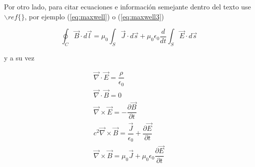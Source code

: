 Por otro lado, para citar ecuaciones e información semejante dentro del texto use $\backslash ref\{\}$, por ejemplo (\ref{eq:maxwell}) o (\ref{eq:maxwell3})

\begin{equation}\label{eq:maxwell}
    \oint_C \vec{B}\cdot d \vec{l}=\mu_0\int_S \vec{J}\cdot d \vec{s}+\mu_0\epsilon_0\dfrac{d }{d t}\int_S \vec{E}\cdot d \vec{s}
\end{equation}

y a su vez

\begin{gather}
    \vec{\nabla}\cdot \vec{E}= \dfrac{\rho}{\epsilon_0}\\
    \vec{\nabla}\cdot \vec{B}= 0\\
    \vec{\nabla}\times\vec{E}=-\dfrac{\partial\vec{B}}{\partial t}\\
    c^2\vec{\nabla}\times\vec{B} =\dfrac{\vec{J}}{\epsilon_0}+\dfrac{\partial
\vec{E}}{\partial t}\label{eq:maxwell3}\\
    \vec{\nabla}\times \vec{B}=\mu_0\vec{J}+\mu_0 \epsilon_0 \dfrac{\partial \vec{E}}{\partial t}
\end{gather}